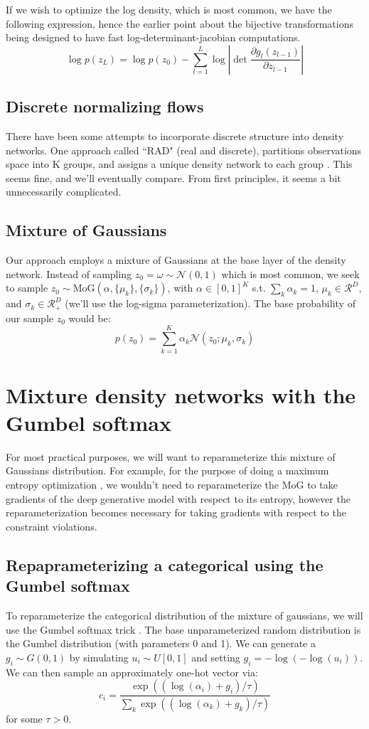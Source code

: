 \documentclass[11pt]{article}
\begin{document}
If we wish to optimize the log density, which is most common, we have the following expression, hence the earlier point about the bijective transformations being designed to have fast log-determinant-jacobian computations.
\[ \log p(z_L) = \log p(z_0) - \sum_{l=1}^L \log \left| \det \frac{\partial g_l(z_{l-1})}{\partial z_{l-1}} \right|  \]

\subsection{Discrete normalizing flows}
There have been some attempts to incorporate discrete structure into density networks.  One approach called ``RAD" (real and discrete), partitions observations space into K groups, and assigns a unique density network to each group \cite{dinh2019rad}.  This seems fine, and we'll eventually compare.  From first principles, it seems a bit unnecessarily complicated.

\subsection{Mixture of Gaussians}
Our approach employs a mixture of Gaussians at the base layer of the density network.  Instead of sampling $z_0 = \omega \sim \mathcal{N}(0, 1)$ which is most common, we seek to sample $z_0 \sim \text{MoG}(\alpha, \{\mu_k\}, \{\sigma_k\})$, with $\alpha \in \left[0, 1\right]^K$ s.t. $\sum_k \alpha_k = 1$, $\mu_k \in \mathcal{R}^D$, and $\sigma_k \in \mathcal{R}^D_+$ (we'll use the log-sigma parameterization).  The base probability of our sample $z_0$ would be:
\begin{equation}
p(z_0) = \sum_{k=1}^K \alpha_k \mathcal{N}(z_0; \mu_k, \sigma_k) 
\end{equation}

\section{Mixture density networks with the Gumbel softmax}
For most practical purposes, we will want to reparameterize this mixture of Gaussians distribution.  For example, for the purpose of doing a maximum entropy optimization \cite{loaiza2017maximum}, we wouldn't need to reparameterize the MoG to take gradients of the deep generative model with respect to its entropy, however the reparameterization becomes necessary for taking gradients with respect to the constraint violations.

\subsection{Repaprameterizing a categorical using the Gumbel softmax}
To reparameterize the categorical distribution of the mixture of gaussians, we will use the Gumbel softmax trick \cite{jang2016categorical}.  The base unparameterized random distribution is the Gumbel distribution (with parameters 0 and 1).  We can generate a $g_i \sim G(0, 1)$ by simulating $u_i \sim U[0, 1]$ and setting $g_i = -\log(- \log(u_i))$.  We can then sample an approximately one-hot vector via:
\[ c_i = \frac{\exp ( (\log (\alpha_i) + g_i) / \tau)}{\sum_k \exp ( (\log (\alpha_k) + g_k) / \tau)} \] 
for some $\tau > 0$.
\end{document}
